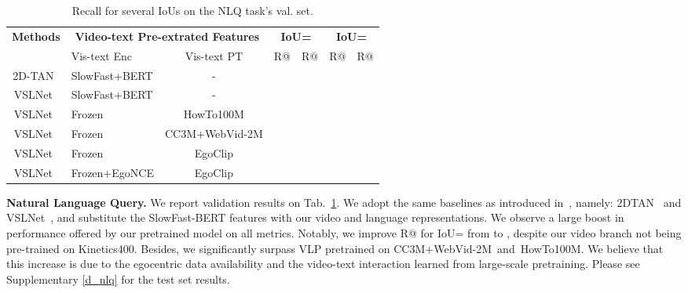 \documentclass{article}
\newcommand{\dataset}{EgoClip}
\newcommand{\model}{EgoNCE\xspace}
\newcommand{\nlq}{Natural Language Query}
\newcommand{\ccweb}{CC3M+WebVid-2M}
\newcommand{\howto}{HowTo100M}
\begin{document}
\begin{table}[b]
\small
\centering
\vspace{-1.em}
\setlength{\tabcolsep}{3pt}
\begin{tabular}{clc|cccc}
	\toprule
	\textbf{Methods} & \multicolumn{2}{c|}{\textbf{Video-text Pre-extrated Features}} & \multicolumn{2}{c}{\textbf{IoU=}} & \multicolumn{2}{c}{\textbf{IoU=}} \\
	& Vis-text Enc & Vis-text PT & R@ & R@ & R@ & R@ \\  \midrule[1pt] 
	2D-TAN~\cite{zhang2020learning} &  SlowFast+BERT& - &  &  &  &    \\
	VSLNet~\cite{zhang2020span}  &  SlowFast+BERT   & - &  &  &  &   \\  
	 \midrule
 	VSLNet~\cite{zhang2020span}  &  Frozen       & \howto        &  &   &  &  \\	
	VSLNet~\cite{zhang2020span}  &  Frozen       & \ccweb &  &  &  &  \\		
	VSLNet~\cite{zhang2020span}  &  Frozen       & \dataset      & \underline{} & \underline{} & \underline{} & \underline{}\\
	VSLNet~\cite{zhang2020span}  &  Frozen+\model& \dataset      &  &  &  &  \\	
	\bottomrule
\end{tabular}
\vspace{.5em}
\centering
\caption{Recall for several IoUs on the NLQ task's val. set.}
\vspace{-1em}
\label{nlq}
\end{table}
%
 \textbf{\nlq.}
We report validation results on Tab.~\ref{nlq}. 
We adopt the same baselines as introduced
in~\cite{grauman2021ego4d}, namely: 2DTAN~\cite{zhang2020learning} and VSLNet~\cite{zhang2020span}, and substitute the SlowFast-BERT features with our video and language representations.
We observe a large boost in performance offered by our pretrained model on all metrics. Notably, we improve R@ for IoU= from  to , despite our video branch not being pre-trained on Kinetics400.
Besides, we significantly surpass VLP pretrained on \ccweb~and~\howto.
We believe that this increase is due to the egocentric data availability and the video-text interaction learned from large-scale pretraining. 
Please see Supplementary \ref{d_nlq} for the test set results.
\end{document}
